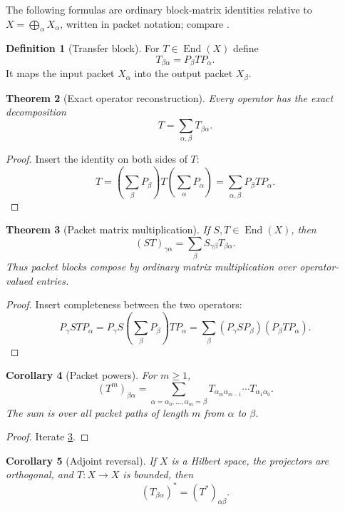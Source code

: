 \documentclass[11pt]{article}
\newtheorem{theorem}{Theorem}[section]
\newtheorem{corollary}[theorem]{Corollary}
\theoremstyle{definition}
\newtheorem{definition}[theorem]{Definition}
\theoremstyle{remark}
\newcommand{\End}{\operatorname{End}}
\begin{document}
The following formulas are ordinary block-matrix identities relative to $X=\bigoplus_{\alpha}X_{\alpha}$, written in packet notation; compare \cite{hornJohnson2012}.

\begin{definition}[Transfer block]
For $T\in\End(X)$ define
\[
{
T_{\beta\alpha}=P_{\beta}TP_{\alpha}.
}
\]
It maps the input packet $X_{\alpha}$ into the output packet $X_{\beta}$.
\end{definition}

\begin{theorem}[Exact operator reconstruction]
\label{thm:operator-reconstruction}
Every operator has the exact decomposition
\[
{
T=\sum_{\alpha,\beta}T_{\beta\alpha}.
}
\]
\end{theorem}

\begin{proof}
Insert the identity on both sides of $T$:
\[
T
=
\left(\sum_{\beta}P_{\beta}\right)
T
\left(\sum_{\alpha}P_{\alpha}\right)
=
\sum_{\alpha,\beta}P_{\beta}TP_{\alpha}.
\]
\end{proof}

\begin{theorem}[Packet matrix multiplication]
\label{thm:block-composition}
If $S,T\in\End(X)$, then
\[
{
(ST)_{\gamma\alpha}
=
\sum_{\beta}S_{\gamma\beta}T_{\beta\alpha}.
}
\]
Thus packet blocks compose by ordinary matrix multiplication over operator-valued entries.
\end{theorem}

\begin{proof}
Insert completeness between the two operators:
\[
P_{\gamma}STP_{\alpha}
=
P_{\gamma}S
\left(\sum_{\beta}P_{\beta}\right)
TP_{\alpha}
=
\sum_{\beta}
(P_{\gamma}SP_{\beta})(P_{\beta}TP_{\alpha}).
\]
\end{proof}

\begin{corollary}[Packet powers]
\label{cor:packet-powers}
For $m\ge1$,
\[
(T^m)_{\beta\alpha}
=
\sum_{\alpha=\alpha_0,\ldots,\alpha_m=\beta}
T_{\alpha_m\alpha_{m-1}}
\cdots
T_{\alpha_1\alpha_0}.
\]
The sum is over all packet paths of length $m$ from $\alpha$ to $\beta$.
\end{corollary}

\begin{proof}
Iterate \cref{thm:block-composition}.
\end{proof}

\begin{corollary}[Adjoint reversal]
\label{cor:adjoint-reversal}
If $X$ is a Hilbert space, the projectors are orthogonal, and $T:X\to X$ is bounded, then
\[
(T_{\beta\alpha})^*=(T^*)_{\alpha\beta}.
\]
\end{corollary}
\end{document}
